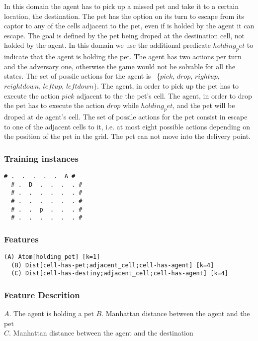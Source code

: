 \documentclass[a4paper]{article}
\begin{document}
In this domain the agent has to pick up a missed pet and take it to a certain location, the destination. The pet has the option on its turn to escape from its captor to any of the cells adjacent to the pet, even if is holded by the agent it can escape. The goal is defined by the pet being droped at the destination cell, not holded by the agent. In this domain we use the additional predicate $holding_pet$ to indicate that the agent is holding the pet. The agent has two actions per turn and the adversary one, otherwise the game would not be solvable for all the states. The set of possile actions for the agent is ~\{$pick$, $drop$, $rightup$, $reightdown$, $leftup$, $leftdown\}$. The agent, in order to pick up the pet has to execute the action $pick$ adjacent to the the pet's cell. The agent, in order to drop the pet has to execute the action $drop$ while $holding_pet$, and the pet will be droped at de agent's cell. The set of possile actions for the pet consist in escape to one of the adjacent cells to it, i.e. at most eight possible actions depending on the position of the pet in the grid. The pet can not move into the delivery point.

\subsubsection{Training instances}
\begin{Verbatim}[fontsize=\footnotesize]
  # .  .  .  .  .  A #
  # .  D  .  .  .  . #
  # .  .  .  .  .  . #
  # .  .  .  .  .  . #
  # .  .  p  .  .  . #
  # .  .  .  .  .  . #
\end{Verbatim}

\subsubsection{Features}
\begin{Verbatim}[fontsize=\footnotesize]
  (A) Atom[holding_pet] [k=1]
  (B) Dist[cell-has-pet;adjacent_cell;cell-has-agent] [k=4]
  (C) Dist[cell-has-destiny;adjacent_cell;cell-has-agent] [k=4]
\end{Verbatim}

\subsubsection{Feature Descrition}
$A$. The agent is holding a pet
$B$. Manhattan distance between the agent and the pet\\
$C$. Manhattan distance between the agent and the destination
\end{document}
